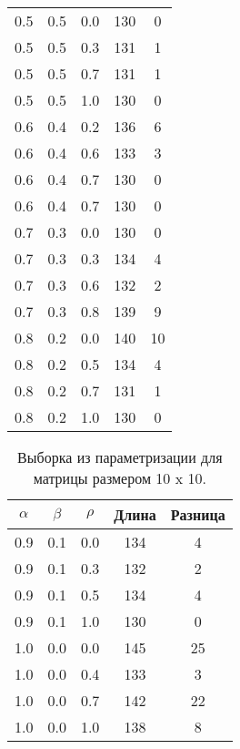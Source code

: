 \begin{table}[h!]
\begin{tabular}{|c|c|c|c|c|}
            \hline
            0.5  & 0.5  & 0.0  & 130    & 0     \\
            0.5  & 0.5  & 0.3  & 131    & 1     \\
            0.5  & 0.5  & 0.7  & 131    & 1     \\
            0.5  & 0.5  & 1.0  & 130    & 0     \\
            \hline
            0.6  & 0.4  & 0.2  & 136    & 6     \\
            0.6  & 0.4  & 0.6  & 133    & 3     \\
            0.6  & 0.4  & 0.7  & 130    & 0     \\
            0.6  & 0.4  & 0.7  & 130    & 0     \\
            \hline
            0.7  & 0.3  & 0.0  & 130    & 0     \\
            0.7  & 0.3  & 0.3  & 134    & 4     \\
            0.7  & 0.3  & 0.6  & 132    & 2     \\
            0.7  & 0.3  & 0.8  & 139    & 9     \\
            \hline
            0.8  & 0.2  & 0.0  & 140    & 10    \\
            0.8  & 0.2  & 0.5  & 134    & 4     \\
            0.8  & 0.2  & 0.7  & 131    & 1     \\
            0.8  & 0.2  & 1.0  & 130    & 0     \\
            \hline
        \end{tabular}
    \end{table}
    
    \begin{table}[h!]
        \caption{Выборка из параметризации для матрицы размером 10 x 10.}
        \label{table:test:params}
        \centering
        \begin{tabular}{|c|c|c|c|c|}
            \hline
            $\alpha$        & $\beta$      & $\rho$      & Длина  & Разница \\
            \hline
            0.9  & 0.1  & 0.0  & 134    & 4     \\
            0.9  & 0.1  & 0.3  & 132    & 2     \\
            0.9  & 0.1  & 0.5  & 134    & 4     \\
            0.9  & 0.1  & 1.0  & 130    & 0     \\
            \hline
            1.0  & 0.0  & 0.0  & 145    & 25     \\
            1.0  & 0.0  & 0.4  & 133    & 3      \\
            1.0  & 0.0  & 0.7  & 142    & 22     \\
            1.0  & 0.0  & 1.0  & 138    & 8      \\
            \hline
        \end{tabular}
    \end{table}

